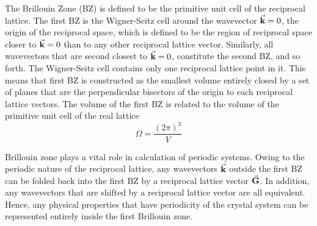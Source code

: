 The Brillouin Zone (BZ) is defined to be the primitive unit cell of the reciprocal lattice. The first BZ is the Wigner-Seitz cell around the wavevector $\va{k}=0$, the origin of the reciprocal space, which is defined to be the region of reciprocal space closer to $\va{k}=0$ than to any other reciprocal lattice vector. Similarly, all wavevectors that are second closest to $\va{k}=0$, constitute the second BZ, and so forth. The Wigner-Seitz cell contains only one reciprocal lattice point in it. This means that first BZ is constructed as the smallest volume entirely closed by a set of planes that are the perpendicular bisectors of the origin to each reciprocal lattice vectors. The volume of the first BZ is  related to the volume of the primitive unit cell of the real lattice
\begin{equation}
    \Omega = \frac{(2\pi)^3}{V}
\end{equation}

Brillouin zone plays a vital role in calculation of periodic systems. Owing to the periodic nature of the reciprocal lattice, any wavevectors $\va{k}$ outside the first BZ can be folded back into the first BZ by a reciprocal lattice vector $\va{G}$. In addition, any wavevectors that are shifted by a reciprocal lattice vector are all equivalent. Hence, any physical properties that have periodicity of the crystal system can be represented entirely inside the first Brillouin zone. 



















